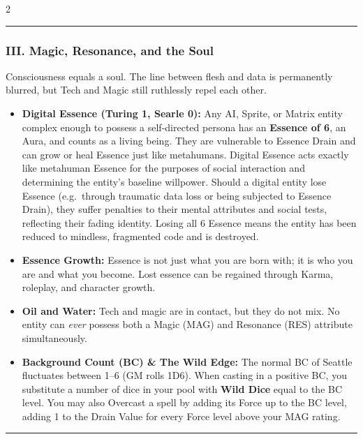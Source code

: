 \documentclass[
  oneside]{article}
\providecommand{\tightlist}{%
  \setlength{\itemsep}{0pt}\setlength{\parskip}{0pt}}
\begin{document}
\begin{multicols}{2}
\begin{center}\rule{0.5\linewidth}{0.5pt}\end{center}

\hypertarget{iii.-magic-resonance-and-the-soul}{%
\subsubsection{III. Magic, Resonance, and the
Soul}\label{iii.-magic-resonance-and-the-soul}}

Consciousness equals a soul. The line between
flesh and data is permanently blurred, but Tech
and Magic still ruthlessly repel each other.

\begin{itemize}
\tightlist
\item
  \textbf{Digital Essence (Turing 1, Searle 0):}
  Any AI, Sprite, or Matrix entity complex enough
  to possess a self-directed persona has an
  \textbf{Essence of 6}, an Aura, and counts as a
  living being. They are vulnerable to Essence
  Drain and can grow or heal Essence just like
  metahumans. Digital Essence acts exactly like
  metahuman Essence for the purposes of social
  interaction and determining the entity's
  baseline willpower. Should a digital entity lose
  Essence (e.g.~through traumatic data loss or
  being subjected to Essence Drain), they suffer
  penalties to their mental attributes and social
  tests, reflecting their fading identity. Losing
  all 6 Essence means the entity has been reduced
  to mindless, fragmented code and is destroyed.
\item
  \textbf{Essence Growth:} Essence is not just
  what you are born with; it is who you are and
  what you become. Lost essence can be regained
  through Karma, roleplay, and character growth.
\item
  \textbf{Oil and Water:} Tech and magic are in
  contact, but they do not mix. No entity can
  \emph{ever} possess both a Magic (MAG) and
  Resonance (RES) attribute simultaneously.
\item
  \textbf{Background Count (BC) \& The Wild Edge:}
  The normal BC of Seattle fluctuates between 1--6
  (GM rolls 1D6). When casting in a positive BC,
  you substitute a number of dice in your pool
  with \textbf{Wild Dice} equal to the BC level.
  You may also Overcast a spell by adding its
  Force up to the BC level, adding 1 to the Drain
  Value for every Force level above your MAG
  rating.
\end{itemize}

\begin{center}\rule{0.5\linewidth}{0.5pt}\end{center}


\end{multicols}
\end{document}
